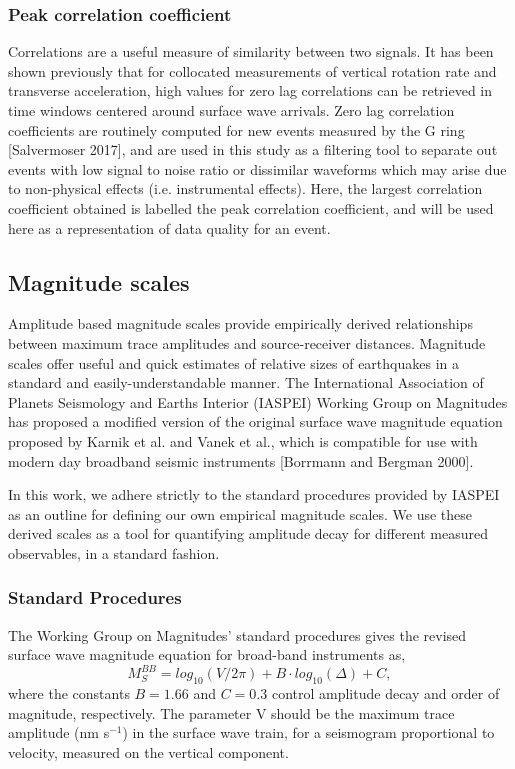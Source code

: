 \documentclass{gji}
\begin{document}
\subsubsection{Peak correlation coefficient}
Correlations are a useful measure of similarity between two signals. It has been shown previously that for collocated measurements of vertical rotation rate and transverse acceleration, high values for zero lag correlations can be retrieved in time windows centered around surface wave arrivals. %
Zero lag correlation coefficients are routinely computed for new events measured by the G ring [Salvermoser 2017], %
and are used in this study as a filtering tool to separate out events with low signal to noise ratio or dissimilar waveforms which may arise due to non-physical effects (i.e. instrumental effects). Here, the largest correlation coefficient obtained is labelled the peak correlation coefficient, and will be used here as a representation of data quality for an event.


\subsection{Magnitude scales}
Amplitude based magnitude scales provide empirically derived relationships between maximum trace amplitudes and source-receiver distances. Magnitude scales offer useful and quick estimates of relative sizes of earthquakes in a standard and easily-understandable manner. 
The International Association of Planets Seismology and Earths Interior (IASPEI) Working Group on Magnitudes has proposed a modified version of the original surface wave magnitude equation proposed by Karnik et al. and Vanek et al., %
which is compatible for use with modern day broadband seismic instruments [Borrmann and Bergman 2000].

In this work, we adhere strictly to the standard procedures provided by IASPEI as an outline for defining our own empirical magnitude scales. We use these derived scales as a tool for quantifying amplitude decay for different measured observables, in a standard fashion.

\subsubsection{Standard Procedures}
The Working Group on Magnitudes' standard procedures gives the revised surface wave magnitude equation for broad-band instruments as,
\begin{equation}\label{eq:mag}
	M_S^{BB} = log_{10}(V/2\pi) + B\cdot log_{10}(\Delta) + C, 
\end{equation}
where the constants $B=1.66$ and $C=0.3$ control amplitude decay and order of magnitude, respectively. The parameter V should be the maximum trace amplitude (nm s$^{-1}$) in the surface wave train, for a seismogram proportional to velocity, measured on the vertical component. 
\end{document}
